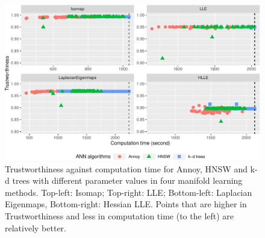 \documentclass[11pt,a4paper,]{article}
\begin{document}
\begin{figure}

{\centering \includegraphics[width=1\linewidth]{mlann_ebs_files/figure-latex/iso-1} 

}

\caption{Trustworthiness against computation time for Annoy, HNSW and k-d trees with different parameter values in four manifold learning methods. Top-left: Isomap; Top-right: LLE; Bottom-left: Laplacian Eigenmaps, Bottom-right: Hessian LLE. Points that are higher in Trustworthiness and less in computation time (to the left) are relatively better. }\label{fig:iso}
\end{figure}
\end{document}
